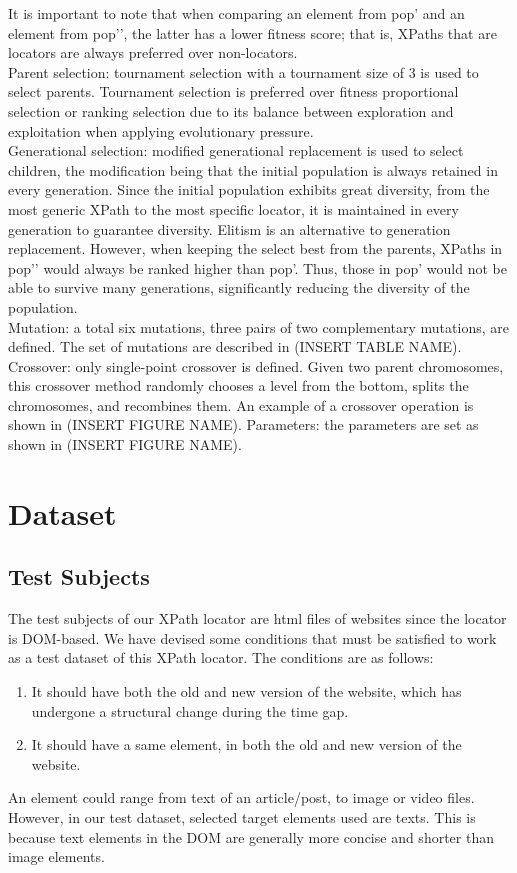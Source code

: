\documentclass[format=acmlarge, nonacm=true]{acmart}
\begin{document}
It is important to note that when comparing an element from pop’ and an element from pop’’, the latter has a lower fitness score; that is, XPaths that are locators are always preferred over non-locators.\\
Parent selection: tournament selection with a tournament size of 3 is used to select parents. Tournament selection is preferred over fitness proportional selection or ranking selection due to its balance between exploration and exploitation when applying evolutionary pressure.\\
Generational selection: modified generational replacement is used to select children, the modification being that the initial population is always retained in every generation. Since the initial population exhibits great diversity, from the most generic XPath to the most specific locator, it is maintained in every generation to guarantee diversity. Elitism is an alternative to generation replacement. However, when keeping the select best from the parents, XPaths in pop’’ would always be ranked higher than pop’. Thus, those in pop’ would not be able to survive many generations, significantly reducing the diversity of the population.\\
Mutation: a total six mutations, three pairs of two complementary mutations, are defined. The set of mutations are described in (INSERT TABLE NAME).\\
Crossover: only single-point crossover is defined. Given two parent chromosomes, this crossover method randomly chooses a level from the bottom, splits the chromosomes, and recombines them. An example of a crossover operation is shown in (INSERT FIGURE NAME).
Parameters: the parameters are set as shown in (INSERT FIGURE NAME).\\

\section{Dataset}
\subsection{Test Subjects}
The test subjects of our XPath locator are html files of websites since the locator is DOM-based. We have devised some conditions that must be satisfied to work as a test dataset of this XPath locator. The conditions are as follows:
\begin{enumerate}
	\item It should have both the old and new version of the website, which has undergone a structural change during the time gap.
	\item It should have a same element, in both the old and new version of the website. 
\end{enumerate}
An element could range from text of an article/post, to image or video files. However, in our test dataset, selected target elements used are texts. This is because text elements in the DOM are generally more concise and shorter than image elements.
\end{document}
